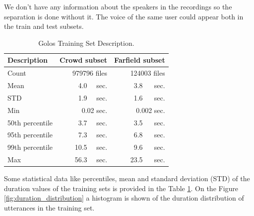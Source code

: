 \documentclass[a4paper]{article}
\begin{document}
We don't have any information about the speakers in the recordings so the separation is done without it. The voice of the same user could appear both in the train and test subsets. 

\begin{table}[t]
  \caption{Golos Training Set Description.}
  \label{tab:dataset_description}
  \centering
  \begin{tabular}{lrr}
    \toprule
    \textbf{Description}      & \textbf{Crowd  subset}     & \textbf{Farfield subset} \\
    \midrule
    Count & 979796 files & 124003 files \\
    Mean & 4.0~~ sec. & 3.8 ~~ sec. \\
    STD &  1.9~~ sec. & 1.6 ~~ sec. \\
    Min & 0.02 sec. & 0.002 sec. \\
    50th percentile& 3.7~~ sec. & 3.5 ~~ sec. \\
    95th percentile& 7.3~~ sec. & 6.8 ~~ sec. \\
    99th percentile& 10.5~~ sec. & 9.6 ~~ sec. \\
    Max & 56.3~~ sec. & 23.5 ~~ sec. \\
    \bottomrule
  \end{tabular}
\end{table}

Some statistical data like percentiles, mean and standard deviation (STD) of the duration values of the training sets is provided in the Table \ref{tab:dataset_description}. On the Figure \ref{fig:duration_distribution} a histogram is shown of the duration distribution of utterances in the training set.
\end{document}
